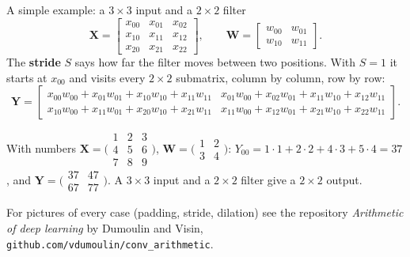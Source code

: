 \documentclass[10pt,aspectratio=169]{beamer}
\begin{document}
\begin{frame}{A simple example: a $3\times3$ input and a $2\times2$ filter}
\small
\[
  \bm{X}=\begin{bmatrix}x_{00}&x_{01}&x_{02}\\ x_{10}&x_{11}&x_{12}\\
  x_{20}&x_{21}&x_{22}\end{bmatrix},\qquad
  \bm{W}=\begin{bmatrix}w_{00}&w_{01}\\ w_{10}&w_{11}\end{bmatrix}.
\]
The \textbf{stride} $S$ says how far the filter moves between two
positions.  With $S=1$ it starts at $x_{00}$ and visits every $2\times2$
submatrix, column by column, row by row:
\[
  \bm{Y}=\begin{bmatrix}
  x_{00}w_{00}+x_{01}w_{01}+x_{10}w_{10}+x_{11}w_{11} &
  x_{01}w_{00}+x_{02}w_{01}+x_{11}w_{10}+x_{12}w_{11}\\[2pt]
  x_{10}w_{00}+x_{11}w_{01}+x_{20}w_{10}+x_{21}w_{11} &
  x_{11}w_{00}+x_{12}w_{01}+x_{21}w_{10}+x_{22}w_{11}
  \end{bmatrix}.
\]
\begin{block}{With numbers}
$\bm{X}=\bigl(\begin{smallmatrix}1&2&3\\4&5&6\\7&8&9\end{smallmatrix}\bigr)$,
$\bm{W}=\bigl(\begin{smallmatrix}1&2\\3&4\end{smallmatrix}\bigr)$:
$Y_{00}=1\cdot1+2\cdot2+4\cdot3+5\cdot4=37$, and
$\bm{Y}=\bigl(\begin{smallmatrix}37&47\\67&77\end{smallmatrix}\bigr)$.
A $3\times3$ input and a $2\times2$ filter give a $2\times2$ output.
\end{block}
\scriptsize
For pictures of every case (padding, stride, dilation) see the repository
\emph{Arithmetic of deep learning} by Dumoulin and Visin,
\texttt{github.com/vdumoulin/conv\_arithmetic}.
\end{frame}
\end{document}
